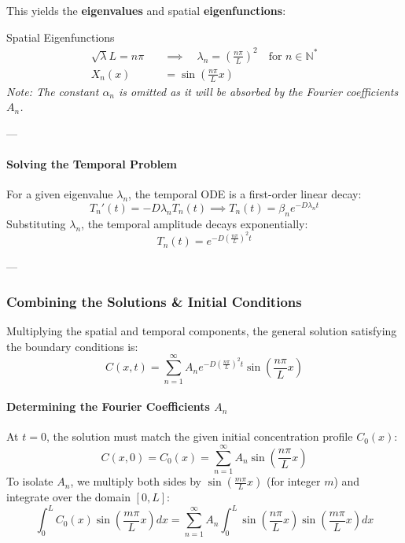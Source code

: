 This yields the \textbf{eigenvalues} and spatial \textbf{eigenfunctions}:
\begin{eqbox}{Spatial Eigenfunctions}
\begin{align*}
\sqrt{\lambda}L = n\pi \quad &\implies \quad \lambda_{n} = \left(\frac{n\pi}{L}\right)^{2} \quad \text{for } n \in \mathbb{N}^* \\
X_{n}(x) &= \sin\left(\frac{n\pi}{L}x\right)
\end{align*}
\textit{Note: The constant $\alpha_{n}$ is omitted as it will be absorbed by the Fourier coefficients $A_{n}$.}
\end{eqbox}

---

\paragraph{Solving the Temporal Problem}
For a given eigenvalue $\lambda_n$, the temporal ODE is a first-order linear decay:
\[
T_{n}'(t) = -D\lambda_{n}T_{n}(t) \implies T_{n}(t) = \beta_{n}e^{-D\lambda_{n}t}
\]
Substituting $\lambda_n$, the temporal amplitude decays exponentially:
\begin{equation}
T_{n}(t) = e^{-D\left(\frac{n\pi}{L}\right)^{2}t}
\end{equation}

---

\subsubsection{Combining the Solutions \& Initial Conditions}

Multiplying the spatial and temporal components, the general solution satisfying the boundary conditions is:
\begin{equation}
C(x,t) = \sum_{n=1}^{\infty} A_{n} e^{-D\left(\frac{n\pi}{L}\right)^{2}t} \sin\left(\frac{n\pi}{L}x\right)
\end{equation}

\paragraph{Determining the Fourier Coefficients $A_n$}
At $t=0$, the solution must match the given initial concentration profile $C_{0}(x)$:
\[
C(x,0) = C_{0}(x) = \sum_{n=1}^{\infty} A_{n}\sin\left(\frac{n\pi}{L}x\right)
\]
To isolate $A_n$, we multiply both sides by $\sin\left(\frac{m\pi}{L}x\right)$ (for integer $m$) and integrate over the domain $[0, L]$:
\[
\int_{0}^{L} C_{0}(x)\sin\left(\frac{m\pi}{L}x\right) dx = \sum_{n=1}^{\infty} A_{n} \int_{0}^{L} \sin\left(\frac{n\pi}{L}x\right)\sin\left(\frac{m\pi}{L}x\right) dx
\]

